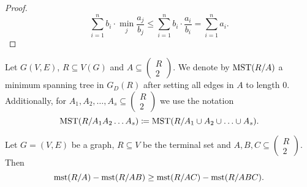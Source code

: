 \documentclass[../skript.tex]{subfiles}
\begin{document}
\begin{proof}
\[
	\sum_{i=1}^n b_i \cdot \min_j \frac{a_j}{b_j} \leq \sum_{i=1}^n b_i \cdot \frac{a_i}{b_i} = \sum_{i=1}^n a_i.
\]
\end{proof}
Let $G(V, E)$, $R \subseteq V(G)$ and $A \subseteq \begin{pmatrix}
R \\ 2
\end{pmatrix}$.
We denote by $\operatorname{MST}(R/A)$ a minimum spanning tree in $G_D(R)$ after setting all edges in $A$ to length 0. Additionally, for $A_1, A_2, \ldots, A_s \subseteq \begin{pmatrix}
R \\ 2
\end{pmatrix}$ we use the notation
\[
	\operatorname{MST}(R/A_1 A_2 \ldots A_s) \coloneqq \operatorname{MST}(R / A_1 \cup A_2 \cup \ldots \cup A_s).
\]
\begin{lemma} %
\label{thm:76}
Let $G = (V, E)$ be a graph, $R \subseteq V$ be the terminal set and $A, B, C \subseteq \begin{pmatrix}
R \\ 2
\end{pmatrix}$. Then
\[
	\operatorname{mst}(R/A) - \operatorname{mst}(R/AB) \geq \operatorname{mst}(R/AC) - \operatorname{mst}(R/ABC).
\]
\end{lemma}
\end{document}
